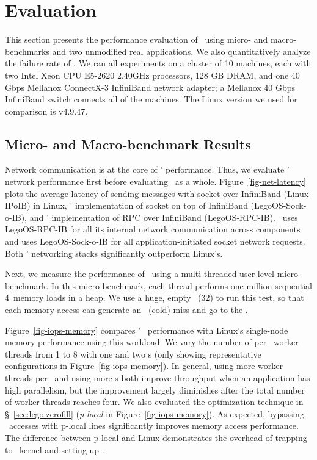 \section{Evaluation}
\label{sec:lego:results}

This section presents the performance evaluation of \lego\ using micro- and macro-benchmarks and two unmodified real applications.
We also quantitatively analyze the failure rate of \lego.
We ran all experiments on a cluster of 10 machines, each with two Intel Xeon CPU E5-2620 2.40GHz
processors, 128 GB DRAM, and one 40 Gbps Mellanox ConnectX-3 InfiniBand network adapter;
a Mellanox 40 Gbps InfiniBand switch connects all of the machines. 
The Linux version we used for comparison is v4.9.47.



\subsection{Micro- and Macro-benchmark Results}
Network communication is at the core of \lego' performance.
Thus, we evaluate \lego' network performance first before evaluating \lego\ as a whole.
Figure~\ref{fig-net-latency} plots the average latency of sending messages with socket-over-InfiniBand (Linux-IPoIB) in Linux,
\lego' implementation of socket on top of InfiniBand (LegoOS-Sock-o-IB), and \lego' implementation of RPC over InfiniBand (LegoOS-RPC-IB).
\lego\ uses LegoOS-RPC-IB for all its internal network communication across components and uses LegoOS-Sock-o-IB for 
all application-initiated socket network requests.
Both \lego' networking stacks significantly outperform Linux's.

Next, we measure the performance of \mcomponent\ using a multi-threaded user-level micro-benchmark. 
In this micro-benchmark, each thread performs one million sequential 4\KB\ memory loads in a heap.
We use a huge, empty \excache\ (32\GB) to run this test, 
so that each memory access can generate an \excache\ (cold) miss and go to the \mcomponent.

Figure~\ref{fig-iops-memory} compares \lego' \mcomponent\ performance 
with Linux's single-node memory performance using this workload.
We vary the number of per-\mcomponent\ worker threads from 1 to 8 
with one and two \mcomponent{}s (only showing representative configurations in Figure~\ref{fig-iops-memory}).
In general, using more worker threads per \mcomponent\ and using more \mcomponent{}s both improve throughput when an application has high parallelism,
but the improvement largely diminishes after the total number of worker threads reaches four.
We also evaluated the optimization technique in \S~\ref{sec:lego:zerofill} ({\em p-local} in Figure~\ref{fig-iops-memory}).
As expected, bypassing \mcomponent\ accesses with p-local lines significantly 
improves memory access performance.
The difference between p-local and Linux demonstrates the overhead of trapping to \lego\ kernel and setting up \excache.

